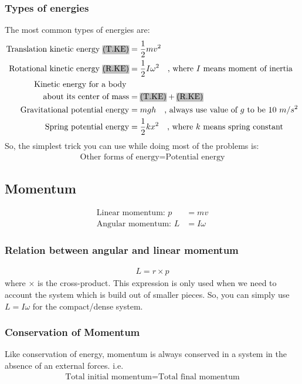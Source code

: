 \documentclass[12pt,a4paper]{article}
\DeclareRobustCommand{\hlgray}[1]{{\sethlcolor{lightgray}\hl{#1}}}
\begin{document}
\subsubsection{Types of energies}
The most common types of energies are:
\begin{align}
\text{Translation kinetic energy \hlgray{(T.KE)}} &= \frac{1}{2}m v^{2} \\
\text{Rotational kinetic energy \hlgray{(R.KE)}} &= \frac{1}{2} I \omega^{2} \quad \text{, where $I$ means moment of inertia}\\
\text{Kinetic energy for a body }& \nonumber\\
\text{about its center of mass} &= \text{\hlgray{(T.KE)}} + \text{\hlgray{(R.KE)}} \\
\text{Gravitational potential energy} &= mgh \quad \text{, always use value of $g$ to be 10 $m/s^{2}$} \\
\text{Spring potential energy} &= \frac{1}{2}k x^{2} \quad \text{, where $k$ means spring constant}
\end{align}
So, the simplest trick you can use while doing most of the problems is:
\begin{align*}
\text{Other forms of energy} = \text{Potential energy}
\end{align*}

\subsection{Momentum}
\begin{align*}
\text{Linear momentum: } p &= mv \\
\text{Angular momentum: } L &= I\omega
\end{align*}

\subsubsection{Relation between angular and linear momentum}
\begin{align}
L = r \times p
\end{align}
where $\times$ is the cross-product. This expression is only used when we need to account the system which is build out of smaller pieces. So, you can simply use $ L = I\omega$ for the compact/dense system.

\subsubsection{Conservation of Momentum}
Like conservation of energy, momentum is always conserved in a system in the absence of an external forces. i.e.
\begin{align*}
\text{Total initial momentum} = \text{Total final momentum}
\end{align*}
\end{document}

